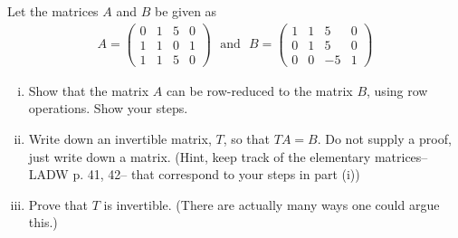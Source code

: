 \begin{question}
    \normalfont

    Let the matrices $A$ and $B$ be given as
    \begin{align*}
        A=
        \begin{pmatrix}
            0 & 1 & 5 & 0 \\
            1 & 1 & 0 & 1 \\
            1 & 1 & 5 & 0
        \end{pmatrix}
        \ \ \ \text{and}\ \ \
        B=
        \begin{pmatrix}
            1 & 1 & 5  & 0 \\
            0 & 1 & 5  & 0 \\
            0 & 0 & -5 & 1
        \end{pmatrix}
    \end{align*}


    \begin{enumerate}[(i)]
        \item Show that the matrix $A$ can be row-reduced to the matrix $B$, using row operations.  Show your steps.

        \item Write down an invertible matrix, $T$, so that $TA=B$.  Do not supply a proof, just write down a matrix.  (Hint, keep track of the elementary matrices-- LADW p. 41, 42-- that correspond to your steps in part (i))

        \item Prove that $T$ is invertible.  (There are actually many ways one could argue this.)
    \end{enumerate}
\end{question}

